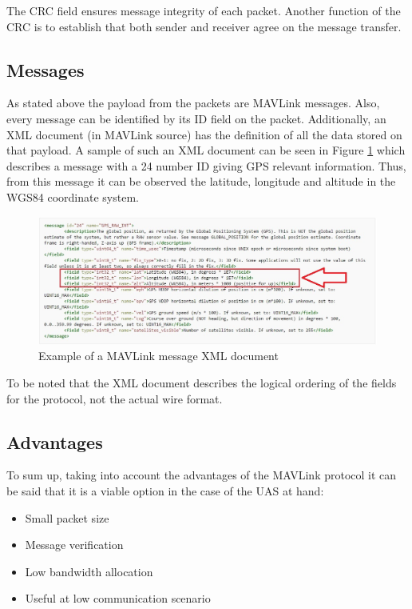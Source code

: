 The CRC field ensures message integrity of each packet. Another function of the CRC is to establish that both sender and receiver agree on the message transfer.

\subsection*{Messages}
As stated above the payload from the packets are MAVLink messages. Also, every message can be identified by its ID field on the packet. Additionally, an XML document (in MAVLink source) has the definition of all the data stored on that payload. A sample of such an XML document can be seen in Figure \ref{fig:mav_msg} which describes a message with a 24 number ID giving GPS relevant information. Thus, from this message it can be observed the latitude, longitude and altitude in the WGS84 coordinate system.

\begin{figure}[H]
	\centering
	\includegraphics[scale=0.5]{figures/mavlink_msg.jpg}
	\caption{Example of a MAVLink message XML document}
	\label{fig:mav_msg}
\end{figure}

To be noted that the XML document describes the logical ordering of the fields for the protocol, not the actual wire format.

\subsection*{Advantages}
To sum up, taking into account the advantages of the MAVLink protocol it can be said that it is a viable option in the case of the UAS at hand:
\begin{itemize}
	\item Small packet size
	\item Message verification
	\item Low bandwidth allocation
	\item Useful at low communication scenario
\end{itemize}
